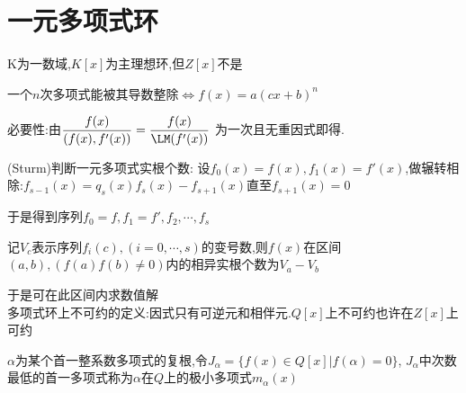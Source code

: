 \section{一元多项式环}
K为一数域,$ K[x]$为主理想环,但$ Z[x]$不是

一个$ n$次多项式能被其导数整除$ \Leftrightarrow f(x)=a(cx+b)^n$

必要性:由$ \dfrac{f(x)}{(f(x),f'(x))}=\dfrac{f(x)}{\LM(f'(x))}$
为一次且无重因式即得.

(Sturm)判断一元多项式实根个数:
设$ f_0(x)=f(x), f_1(x)=f'(x)$,做辗转相除:$ f_{s-1}(x)=q_s(x)f_s(x)-f_{s+1}(x)$直至$ f_{s+1}(x)=0$

于是得到序列$ f_0=f,f_1=f',f_2,\cdots,f_s$

记$ V_c$表示序列$ f_i(c),(i=0,\cdots,s)$的变号数,则$ f(x)$在区间$ (a,b),(f(a)f(b)\ne 0)$内的相异实根个数为$ V_a-V_b $

于是可在此区间内求数值解
\\

多项式环上不可约的定义:因式只有可逆元和相伴元.$Q[x] $上不可约也许在$ Z[x]$上可约

$ \alpha $为某个首一整系数多项式的复根,令$ J_{\alpha}=\{ f(x)\in Q[x] | f(\alpha)=0\}$,
$ J_{\alpha}$中次数最低的首一多项式称为$ \alpha $在$ Q$上的极小多项式$ m_{\alpha}(x)$
